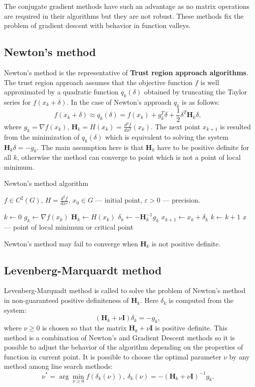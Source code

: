 \documentclass[12pt, bachelor, substylefile = algo_title.rtx]{disser}
\newcommand{\eps}{\varepsilon}
\theoremstyle{definition}
\begin{document}
The conjugate gradient methods have such an advantage as no matrix operations are required in their algorithms but they are not robust. These methods fix the problem of gradient descent with behavior in function valleys.

\subsection{Newton's method}
Newton's method is the representative of \textbf{Trust region approach algorithms}. The trust region approach assumes that the objective function $f$ is well approximated by a quadratic function $q_k (\delta)$ obtained by truncating the Taylor series for $f(x_k + \delta)$. In the case of Newton's approach $q_k$ is as follows:
\[ f(x_k + \delta) \approx q_k(\delta) = f(x_k) + g_k^T \delta + \frac{1}{2} \delta^T \mathbf{H}_k \delta, \]
where $g_k = \nabla f(x_k)$, $\mathbf{H}_k = H(x_k) = \frac{d^2 f}{dx^2}(x_k)$. The next point $x_{k+1}$ is resulted from the minimization of $q_k(\delta)$ which is equivalent to solving the system $\mathbf{H}_k \delta = -g_k$. The main assumption here is that $\mathbf{H}_k$ have to be positive definite for all $k$, otherwise the method can converge to point which is not a point of local minimum. 

\begin{algorithm}[h]
\caption{Newton's method algorithm}
\label{alg: newton}
\begin{algorithmic}

\Require $f \in C^2(G)$, $H = \frac{d^2 f}{dx^2}$, $x_0 \in G$ --- initial point, $\eps>0$ --- precision. 

\State $k \gets 0$
\While{$\|x_k - x_{k-1}\| > \eps$}
\State $g_k \gets \nabla f(x_k)$
\State $\mathbf{H}_k \gets H(x_k)$
\State $\delta_k \gets -\mathbf{H}^{-1}_k g_k$
\State $x_{k+1} \gets x_{k} + \delta_{k}$
\State $k \gets k+1$
\EndWhile
\Ensure $\widehat{x}$ --- point of local minimum or critical point
\end{algorithmic}
\end{algorithm}

Newton’s method may fail to converge when $\mathbf{H}_k$ is not positive definite.

\subsection{Levenberg-Marquardt method}
Levenberg-Marquadt method is called to solve the problem of Newton's method in non-guaranteed positive definiteness of $\mathbf{H}_k$. Here $\delta_k$ is computed from the system:
\[ (\mathbf{H}_k + \nu \mathbf{I})\delta_k = -g_k, \]
where $\nu \ge 0$ is chosen so that the matrix $\mathbf{H}_k + \nu \mathbf{I}$ is positive definite. This method is a combination of Newton's and Gradient Descent methods so it is possible to adjust the behavior of the algorithm depending on the properties of function in current point. It is possible to choose the optimal parameter $\nu$ by any method among line search methods:
\[ \nu^* = \arg \min_{\nu \ge 0} f(\delta_k(\nu)),\  \delta_k(\nu) = -  (\mathbf{H}_k + \nu \mathbf{I})^{-1}g_k.\]
\end{document}
